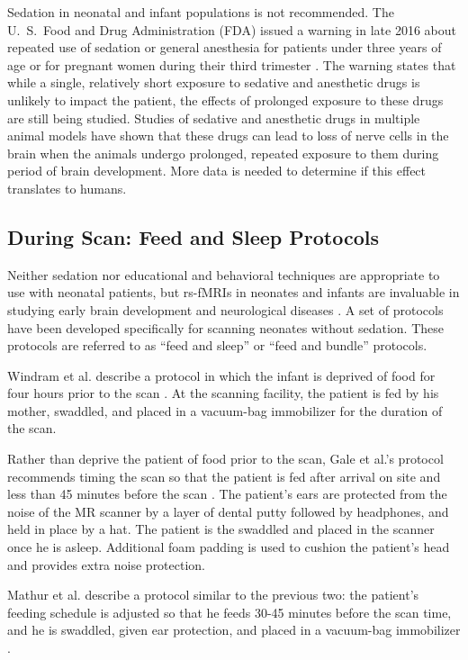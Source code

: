 Sedation in neonatal and infant populations is not recommended. The  U.~S.~Food and Drug Administration (FDA) issued a warning in late 2016 about repeated use of sedation or general anesthesia for patients under three years of age or for pregnant women during their third trimester \cite{FDA2016}. The warning states that while a single, relatively short exposure to sedative and anesthetic drugs is unlikely to impact the patient, the effects of prolonged exposure to these drugs are still being studied. Studies of sedative and anesthetic drugs in multiple animal models have shown that these drugs can lead to loss of nerve cells in the brain when the animals undergo prolonged, repeated exposure to them during period of brain development. More data is needed to determine if this effect translates to humans.

\subsection{During Scan: Feed and Sleep Protocols}

Neither sedation nor educational and behavioral techniques are appropriate to use with neonatal patients, but rs-fMRIs in neonates and infants are invaluable  in studying early brain development and neurological diseases \cite{Smyser2015}. A set of protocols have been developed specifically for scanning neonates without sedation. These protocols are referred to as ``feed and sleep'' or ``feed and bundle'' protocols.

Windram et al. describe a protocol in which the infant is deprived of food for four hours prior to the scan \cite{Windram2011}. At the scanning facility, the patient is fed by his mother, swaddled, and placed in a vacuum-bag immobilizer for the duration of the scan. 

Rather than deprive the patient of food prior to the scan, Gale et al.'s protocol recommends timing the scan so that the patient is fed after arrival on site and less than 45 minutes before the scan \cite{Gale2013}. The patient's ears are protected from the noise of the MR scanner by a layer of dental putty followed by headphones, and held in place by a hat. The patient is the swaddled and placed in the scanner once he is asleep. Additional foam padding is used to cushion the patient's head and provides extra noise protection.

Mathur et al. describe a protocol similar to the previous two: the patient's feeding schedule is adjusted so that he feeds 30-45 minutes before the scan time, and he is swaddled, given ear protection, and placed in a vacuum-bag immobilizer \cite{Mathur2008}.

